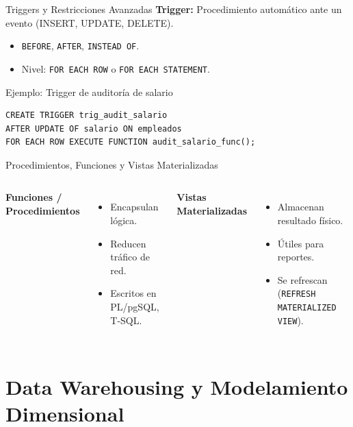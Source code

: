 \documentclass[aspectratio=169, 10pt, xcolor=table]{beamer}
\begin{document}
\begin{frame}[fragile]{Triggers y Restricciones Avanzadas}
    \textbf{Trigger:} Procedimiento automático ante un evento (INSERT, UPDATE, DELETE).
    \begin{itemize}
        \item \texttt{BEFORE}, \texttt{AFTER}, \texttt{INSTEAD OF}.
        \item Nivel: \texttt{FOR EACH ROW} o \texttt{FOR EACH STATEMENT}.
    \end{itemize}
    \begin{exampleblock}{Ejemplo: Trigger de auditoría de salario}
\begin{verbatim}
CREATE TRIGGER trig_audit_salario
AFTER UPDATE OF salario ON empleados
FOR EACH ROW EXECUTE FUNCTION audit_salario_func();
\end{verbatim}
    \end{exampleblock}
\end{frame}

\begin{frame}{Procedimientos, Funciones y Vistas Materializadas}
    \begin{columns}[t]
        \textbf{Funciones / Procedimientos}
        \begin{itemize}
            \item Encapsulan lógica.
            \item Reducen tráfico de red.
            \item Escritos en PL/pgSQL, T-SQL.
        \end{itemize}
        \textbf{Vistas Materializadas}
        \begin{itemize}
            \item Almacenan resultado físico.
            \item Útiles para reportes.
            \item Se refrescan (\texttt{REFRESH MATERIALIZED VIEW}).
        \end{itemize}
    \end{columns}
\end{frame}

\section{Data Warehousing y Modelamiento Dimensional}
\end{document}
